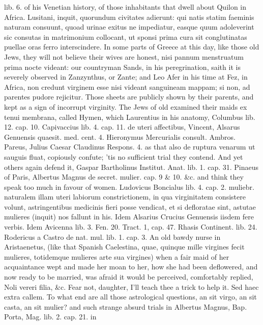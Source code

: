 {lib. 6. of his Venetian history, of those inhabitants that dwell about
Quilon in Africa. Lusitani, inquit, quorundum civitates adierunt: qui
natis statim faeminis naturam consuunt, quoad urinae exitus ne
impediatur, easque quum adoleverint sic consutas in matrimonium
collocant, ut sponsi prima cura sit conglutinatas puellae oras ferro
interscindere. In some parts of Greece at this day, like those old
Jews, they will not believe their wives are honest, nisi pannum
menstruatum prima nocte videant: our countryman Sands, in his
peregrination, saith it is severely observed in Zanzynthus, or Zante;
and Leo Afer in his time at Fez, in Africa, non credunt virginem esse
nisi videant sanguineam mappam; si non, ad parentes pudore rejicitur.
Those sheets are publicly shown by their parents, and kept as a sign of
incorrupt virginity. The Jews of old examined their maids ex tenui
membrana, called Hymen, which Laurentius in his anatomy, Columbus lib.
12. cap. 10. Capivaccius lib. 4. cap. 11. de uteri affectibus, Vincent,
Alsarus Genuensis quaesit. med. cent. 4. Hieronymus Mercurialis
consult. Ambros. Pareus, Julius Caesar Claudinus Respons. 4. as that
also de ruptura venarum ut sauguis fluat, copiously confute; 'tis
no sufficient trial they contend. And yet others again defend it,
Gaspar Bartholinus Institut. Anat. lib. 1. cap. 31. Pinaeus of Paris,
Albertus Magnus de secret. mulier. cap. 9 \& 10. \&c. and think they
speak too much in favour of women.  Ludovicus Boncialus lib. 4.
cap. 2. muliebr. naturalem illam uteri labiorum constrictionem, in qua
virginitatem consistere volunt, astringentibus medicinis fieri posse
vendicat, et si defloratae sint, astutae mulieres (inquit) nos
fallunt in his. Idem Alsarius Crucius Genuensis iisdem fere verbis.
Idem Avicenna lib. 3. Fen. 20. Tract. 1, cap. 47. Rhasis
Continent. lib. 24. Rodericus a Castro de nat. mul. lib. 1. cap. 3. An
old bawdy nurse in Aristaenetus, (like that Spanish Caelestina,
quae, quinque mille virgines fecit mulieres, totidemque mulieres
arte sua virgines) when a fair maid of her acquaintance wept and made
her moan to her, how she had been deflowered, and now ready to be
married, was afraid it would be perceived, comfortably replied, Noli
vereri filia, \&c. Fear not, daughter, I'll teach thee a trick to help
it. Sed haec extra callem. To what end are all those astrological
questions, an sit virgo, an sit casta, an sit mulier? and such strange
absurd trials in Albertus Magnus, Bap. Porta, Mag. lib. 2. cap. 21. in
}

